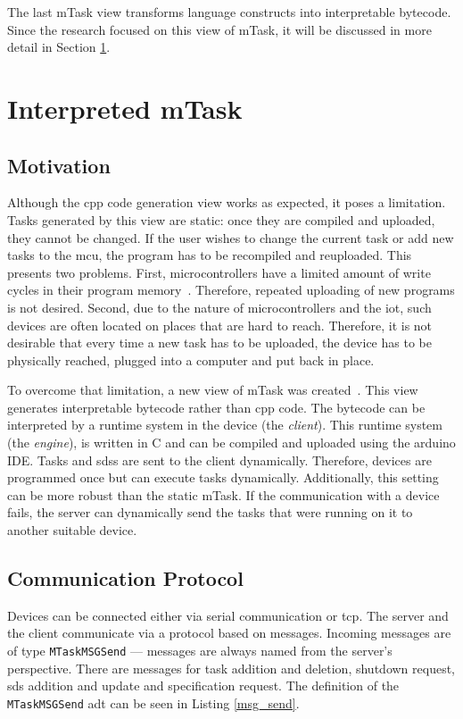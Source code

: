 The last \gls{mTask} view transforms language constructs into interpretable bytecode. Since the research focused on this view of \gls{mTask}, it will be discussed in more detail in Section \ref{sec:int_mtask}.

\section{Interpreted mTask}\label{sec:int_mtask}

\subsection{Motivation}

Although the \gls{cpp} code generation view works as expected, it poses a limitation. Tasks generated by this view are static: once they are compiled and uploaded, they cannot be changed. If the user wishes to change the current task or add new tasks to the \gls{mcu}, the program has to be recompiled and reuploaded. This presents two problems. First, microcontrollers have a limited amount of write cycles in their program memory~\cite{martthesis}. Therefore, repeated uploading of new programs is not desired. Second, due to the nature of microcontrollers and the \ac{iot}, such devices are often located on places that are hard to reach. Therefore, it is not desirable that every time a new task has to be uploaded, the device has to be physically reached, plugged into a computer and put back in place.

To overcome that limitation, a new view of \gls{mTask} was created~\cite{martthesis}. This view generates interpretable bytecode rather than \gls{cpp} code. The bytecode can be interpreted by a runtime system in the device (the \textit{client}). This runtime system (the \textit{engine}), is written in C and can be compiled and uploaded using the \gls{arduino} IDE. Tasks and \acp{sds} are sent to the client dynamically. Therefore, devices are programmed once but can execute tasks dynamically. Additionally, this setting can be more robust than the static \gls{mTask}. If the communication with a device fails, the server can dynamically send the tasks that were running on it to another suitable device. 

\subsection{Communication Protocol}\label{sec:mtask_com_prot}

Devices can be connected either via serial communication or \acs{tcp}. The server and the client communicate via a protocol based on messages. Incoming messages are of type \texttt{MTaskMSGSend} --- messages are always named from the server's perspective. There are messages for task addition and deletion, shutdown request, \ac{sds} addition and update and specification request. The definition of the \texttt{MTaskMSGSend} \ac{adt} can be seen in Listing \ref{msg_send}.

